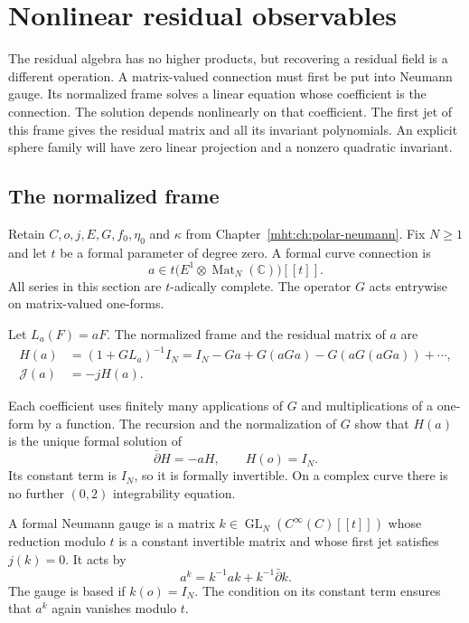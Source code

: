 \chapter{Nonlinear residual observables}
\label{mht:ch:nonlinear-neumann}

The residual algebra has no higher products, but recovering a residual
field is a different operation. A matrix-valued connection must first be
put into Neumann gauge. Its normalized frame solves a linear equation
whose coefficient is the connection. The solution depends nonlinearly
on that coefficient. The first jet of this frame gives the residual
matrix and all its invariant polynomials. An explicit sphere family
will have zero linear projection and a nonzero quadratic invariant.

\section{The normalized frame}

Retain $C,o,j,E,G,f_0,\eta_0$ and $\kappa$ from
Chapter~\ref{mht:ch:polar-neumann}. Fix $N\geq1$ and let $t$ be a formal
parameter of degree zero. A formal curve connection is
\[
 a\in t\bigl(E^1\otimes\operatorname{Mat}_N(\mathbb C)\bigr)[[t]].
\]
All series in this section are $t$-adically complete. The operator $G$
acts entrywise on matrix-valued one-forms.

\begin{definition}\label{mht:def:normalized-frame}
Let $L_a(F)=aF$. The normalized frame and the residual matrix of $a$ are
\begin{align}
 H(a)&=(1+GL_a)^{-1}I_N
       =I_N-Ga+G(aGa)-G(aG(aGa))+\cdots,\label{mht:eq:frame}\\
 \mathcal J(a)&=-jH(a).\label{mht:eq:nonlinear-residual}
\end{align}
\end{definition}

Each coefficient uses finitely many applications of $G$ and
multiplications of a one-form by a function. The recursion and the
normalization of $G$ show that $H(a)$ is the unique formal solution of
\begin{equation}\label{mht:eq:frame-equation}
 \bar\partial H=-aH,\qquad H(o)=I_N.
\end{equation}
Its constant term is $I_N$, so it is formally invertible.
On a complex curve there is no further $(0,2)$ integrability equation.

A formal Neumann gauge is a matrix
$k\in\operatorname{GL}_N(C^\infty(C)[[t]])$ whose reduction modulo $t$
is a constant invertible matrix and whose first jet satisfies $j(k)=0$.
It acts by
\[
 a^k=k^{-1}ak+k^{-1}\bar\partial k.
\]
The gauge is based if $k(o)=I_N$. The condition on its constant term
ensures that $a^k$ again vanishes modulo $t$.

